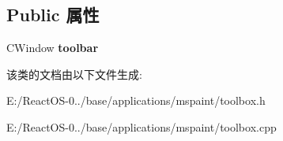 \subsection*{Public 属性}
\begin{DoxyCompactItemize}
\item 
\mbox{\label{class_c_tool_box_a3ab3957a8f63f3fc4d838176d9523b60}} 
C\+Window {\bfseries toolbar}
\end{DoxyCompactItemize}


该类的文档由以下文件生成\+:\begin{DoxyCompactItemize}
\item 
E\+:/\+React\+O\+S-\/0../base/applications/mspaint/toolbox.\+h\item 
E\+:/\+React\+O\+S-\/0../base/applications/mspaint/toolbox.\+cpp\end{DoxyCompactItemize}
